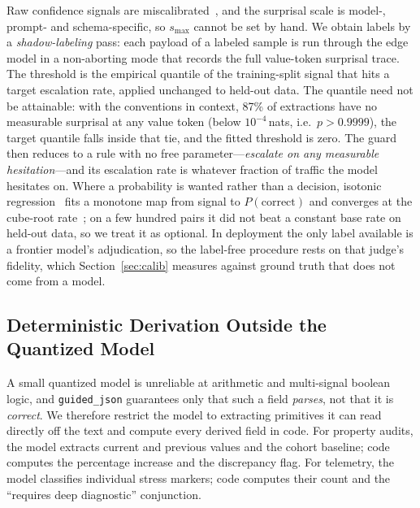 \documentclass[conference]{IEEEtran}
\begin{document}
Raw confidence signals are miscalibrated~\cite{guo}, and the surprisal scale is model-, prompt- and schema-specific, so $s_{\max}$ cannot be set by hand. We obtain labels by a \emph{shadow-labeling} pass: each payload of a labeled sample is run through the edge model in a non-aborting mode that records the full value-token surprisal trace. The threshold is the empirical quantile of the training-split signal that hits a target escalation rate, applied unchanged to held-out data. The quantile need not be attainable: with the conventions in context, 87\% of extractions have no measurable surprisal at any value token (below $10^{-4}$\,nats, i.e.\ $p>0.9999$), the target quantile falls inside that tie, and the fitted threshold is zero. The guard then reduces to a rule with no free parameter---\emph{escalate on any measurable hesitation}---and its escalation rate is whatever fraction of traffic the model hesitates on. Where a probability is wanted rather than a decision, isotonic regression~\cite{barlow1972,zadrozny} fits a monotone map from signal to $P(\text{correct})$ and converges at the cube-root rate~\cite{zhang2002}; on a few hundred pairs it did not beat a constant base rate on held-out data, so we treat it as optional. In deployment the only label available is a frontier model's adjudication, so the label-free procedure rests on that judge's fidelity, which Section~\ref{sec:calib} measures against ground truth that does not come from a model.

\subsection{Deterministic Derivation Outside the Quantized Model}
\label{sec:derive}

A small quantized model is unreliable at arithmetic and multi-signal boolean logic, and \texttt{guided\_json} guarantees only that such a field \emph{parses}, not that it is \emph{correct}. We therefore restrict the model to extracting primitives it can read directly off the text and compute every derived field in code. For property audits, the model extracts current and previous values and the cohort baseline; code computes the percentage increase and the discrepancy flag. For telemetry, the model classifies individual stress markers; code computes their count and the ``requires deep diagnostic'' conjunction.
\end{document}
